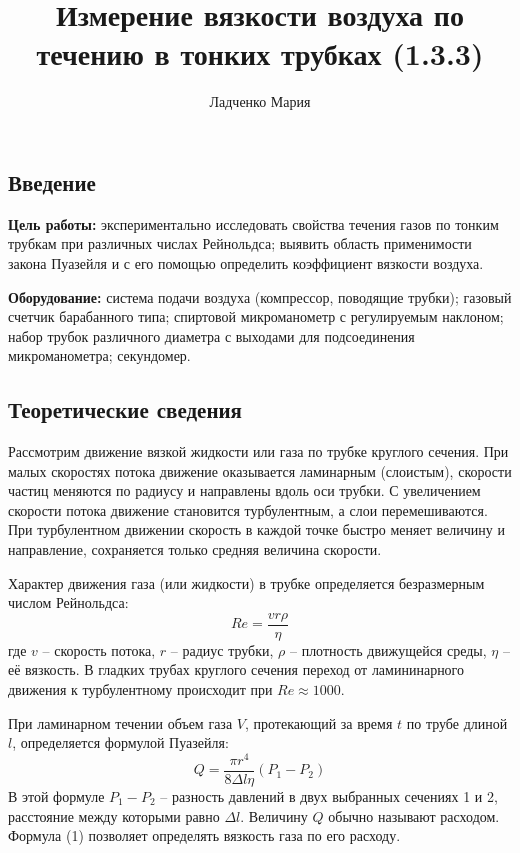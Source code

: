 \documentclass[a4paper, 12pt]{article}
\title{\textbf{Измерение вязкости воздуха по течению в тонких трубках (1.3.3)}}
\author{Ладченко Мария}
\date{}
\begin{document}
\maketitle
	      	
    \begin{center}
    \section*{Введение}    
    \end{center}

    \noindent \textbf{Цель работы:} экспериментально исследовать свойства течения газов по тонким трубкам при различных числах Рейнольдса; выявить область применимости закона Пуазейля и с его помощью определить коэффициент вязкости воздуха.

    \bigskip

    \noindent \textbf{Оборудование:} система подачи воздуха (компрессор, поводящие трубки); газовый счетчик барабанного типа; спиртовой микроманометр с регулируемым наклоном; набор трубок различного диаметра с выходами для подсоединения микроманометра; секундомер.
    \bigskip

\begin{center}
\subsection*{Теоретические сведения}    
\end{center}

Рассмотрим движение вязкой жидкости или газа по трубке круглого сечения. При малых скоростях потока движение оказывается ламинарным (слоистым), скорости частиц меняются по радиусу и направлены вдоль оси трубки. С увеличением скорости потока движение становится турбулентным, а слои перемешиваются. При турбулентном движении скорость в каждой точке быстро меняет величину и направление, сохраняется только средняя величина скорости.

Характер движения газа (или жидкости) в трубке определяется безразмерным числом Рейнольдса:
\[
	Re = \frac{vr\rho}{\eta}
\]
где $v$ -- скорость потока, $r$ -- радиус трубки, $\rho$ -- плотность движущейся среды, $\eta$ -- её вязкость. В гладких трубах круглого сечения переход от ламининарного движения к турбулентному происходит при $Re \approx 1000$.

При ламинарном течении объем газа $V$, протекающий за время $t$ по трубе длиной $l$, определяется формулой Пуазейля:
\begin{equation}
	Q = \frac{\pi r^4}{8 \Delta l \eta}(P_1 - P_2)
\end{equation}
В этой формуле $P_1 - P_2$ -- разность давлений в двух выбранных сечениях 1 и 2, расстояние между которыми равно $\Delta l$. Величину $Q$ обычно называют расходом. Формула (1) позволяет определять вязкость газа по его расходу.
\end{document}
